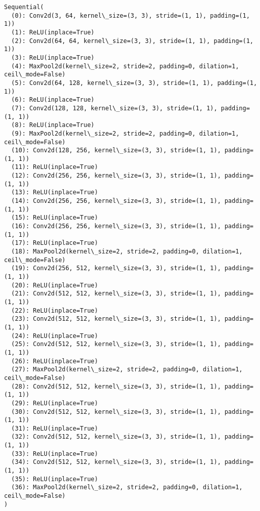             \begin{tcolorbox}[breakable, size=fbox, boxrule=.5pt, pad at break*=1mm, opacityfill=0]
\begin{Verbatim}[commandchars=\\\{\}]
Sequential(
  (0): Conv2d(3, 64, kernel\_size=(3, 3), stride=(1, 1), padding=(1, 1))
  (1): ReLU(inplace=True)
  (2): Conv2d(64, 64, kernel\_size=(3, 3), stride=(1, 1), padding=(1, 1))
  (3): ReLU(inplace=True)
  (4): MaxPool2d(kernel\_size=2, stride=2, padding=0, dilation=1,
ceil\_mode=False)
  (5): Conv2d(64, 128, kernel\_size=(3, 3), stride=(1, 1), padding=(1, 1))
  (6): ReLU(inplace=True)
  (7): Conv2d(128, 128, kernel\_size=(3, 3), stride=(1, 1), padding=(1, 1))
  (8): ReLU(inplace=True)
  (9): MaxPool2d(kernel\_size=2, stride=2, padding=0, dilation=1,
ceil\_mode=False)
  (10): Conv2d(128, 256, kernel\_size=(3, 3), stride=(1, 1), padding=(1, 1))
  (11): ReLU(inplace=True)
  (12): Conv2d(256, 256, kernel\_size=(3, 3), stride=(1, 1), padding=(1, 1))
  (13): ReLU(inplace=True)
  (14): Conv2d(256, 256, kernel\_size=(3, 3), stride=(1, 1), padding=(1, 1))
  (15): ReLU(inplace=True)
  (16): Conv2d(256, 256, kernel\_size=(3, 3), stride=(1, 1), padding=(1, 1))
  (17): ReLU(inplace=True)
  (18): MaxPool2d(kernel\_size=2, stride=2, padding=0, dilation=1,
ceil\_mode=False)
  (19): Conv2d(256, 512, kernel\_size=(3, 3), stride=(1, 1), padding=(1, 1))
  (20): ReLU(inplace=True)
  (21): Conv2d(512, 512, kernel\_size=(3, 3), stride=(1, 1), padding=(1, 1))
  (22): ReLU(inplace=True)
  (23): Conv2d(512, 512, kernel\_size=(3, 3), stride=(1, 1), padding=(1, 1))
  (24): ReLU(inplace=True)
  (25): Conv2d(512, 512, kernel\_size=(3, 3), stride=(1, 1), padding=(1, 1))
  (26): ReLU(inplace=True)
  (27): MaxPool2d(kernel\_size=2, stride=2, padding=0, dilation=1,
ceil\_mode=False)
  (28): Conv2d(512, 512, kernel\_size=(3, 3), stride=(1, 1), padding=(1, 1))
  (29): ReLU(inplace=True)
  (30): Conv2d(512, 512, kernel\_size=(3, 3), stride=(1, 1), padding=(1, 1))
  (31): ReLU(inplace=True)
  (32): Conv2d(512, 512, kernel\_size=(3, 3), stride=(1, 1), padding=(1, 1))
  (33): ReLU(inplace=True)
  (34): Conv2d(512, 512, kernel\_size=(3, 3), stride=(1, 1), padding=(1, 1))
  (35): ReLU(inplace=True)
  (36): MaxPool2d(kernel\_size=2, stride=2, padding=0, dilation=1,
ceil\_mode=False)
)
\end{Verbatim}
\end{tcolorbox}
        

